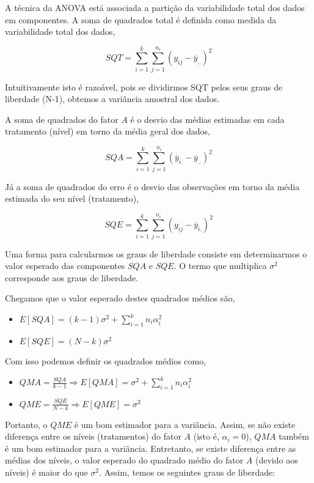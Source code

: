 \documentclass[
]{book}
\providecommand{\tightlist}{%
  \setlength{\itemsep}{0pt}\setlength{\parskip}{0pt}}
\begin{document}
A técnica da ANOVA está associada a partição da variabilidade total dos dados em componentes. A soma de quadrados total é definida como medida da variabilidade total dos dados,

\[SQT=\sum_{i=1}^{k}\sum_{j=1}^{n_{i}}(y_{ij} - \overline{y}_{..})^{2}\]

Intuitivamente isto é razoável, pois se dividirmos SQT pelos seus graus de liberdade (N-1), obtemos a variância amostral dos dados.

A soma de quadrados do fator \(A\) é o desvio das médias estimadas em cada tratamento (nível) em torno da média geral dos dados,

\[SQA=\sum_{i=1}^{k}\sum_{j=1}^{n_{i}}(\bar y_{i.} - \overline{y}_{..})^{2}\]

Já a soma de quadrados do erro é o desvio das observações em torno da média estimada do seu nível (tratamento),

\[SQE=\sum_{i=1}^{k}\sum_{j=1}^{n_{i}}(y_{ij} - \overline{y}_{i.})^{2}\]

Uma forma para calcularmos os graus de liberdade consiste em determinarmos o valor esperado das componentes \(SQA\) e \(SQE\). O termo que multiplica \(\sigma^2\) corresponde aos graus de liberdade.

Chegamos que o valor esperado destes quadrados médios são,

\begin{itemize}
\tightlist
\item
  \(E[SQA]=(k-1)\sigma^2+\sum_{i=1}^{k} n_i\alpha_i^2\)
\item
  \(E[SQE]=(N-k)\sigma^2\)
\end{itemize}

Com isso podemos definir os quadrados médios como,

\begin{itemize}
\tightlist
\item
  \(QMA=\frac{SQA}{k-1}\Longrightarrow E[QMA]=\sigma^2+\sum_{i=1}^{k} n_i\alpha_i^2\)
\item
  \(QME=\frac{SQE}{N-k}\Longrightarrow E[QME]=\sigma^2\)
\end{itemize}

Portanto, o \(QME\) é um bom estimador para a variância. Assim, se não existe diferença entre os níveis (tratamentos) do fator \(A\) (isto é, \(\alpha_i=0\)), \(QMA\) também é um bom estimador para a variância. Entretanto, se existe diferença entre as médias dos níveis, o valor esperado do quadrado médio do fator \(A\) (devido aos níveis) é maior do que \(\sigma^2\). Assim, temos os seguintes graus de liberdade:
\end{document}
